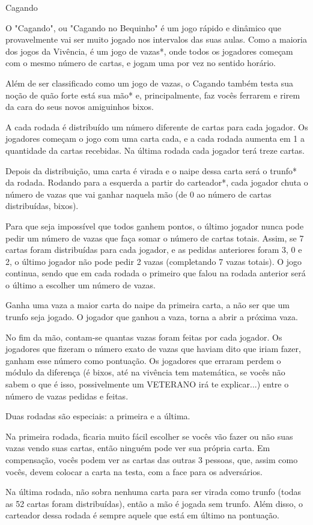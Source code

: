 \begin{subsecao}{Cagando}

O "Cagando", ou "Cagando no Bequinho" é um jogo rápido e dinâmico que
provavelmente vai ser muito jogado nos intervalos das suas aulas. Como a maioria
dos jogos da Vivência, é um jogo de vazas*, onde todos os jogadores começam com
o mesmo número de cartas, e jogam uma por vez no sentido horário.

Além de ser classificado como um jogo de vazas, o Cagando também testa sua noção
de quão forte está sua mão* e, principalmente, faz vocês ferrarem e rirem da
cara do seus novos amiguinhos bixos.

A cada rodada é distribuído um número diferente de cartas para cada jogador. Os
jogadores começam o jogo com uma carta cada, e a cada rodada aumenta em 1 a
quantidade da cartas recebidas. Na última rodada cada jogador terá treze cartas.

Depois da distribuição, uma carta é virada e o naipe dessa carta será o trunfo*
da rodada. Rodando para a esquerda a partir do carteador*, cada jogador chuta o
número de vazas que vai ganhar naquela mão (de 0 ao número de cartas
distribuídas, bixos).

Para que seja impossível que todos ganhem pontos, o último jogador nunca pode
pedir um número de vazas que faça somar o número de cartas totais. Assim, se 7
cartas foram distribuídas para cada jogador, e as pedidas anteriores foram 3, 0
e 2, o último jogador não pode pedir 2 vazas (completando 7 vazas totais). O
jogo continua, sendo que em cada rodada o primeiro que falou na rodada anterior
será o último a escolher um número de vazas. 

Ganha uma vaza a maior carta do naipe da primeira carta, a não ser que um
trunfo seja jogado. O jogador que ganhou a vaza, torna a abrir a próxima vaza. 

No fim da mão, contam-se quantas vazas foram feitas por cada
jogador. Os jogadores que fizeram o número exato de vazas que haviam
dito que iriam fazer, ganham esse número como pontuação. Os jogadores
que erraram perdem o módulo da diferença (é bixos, até na vivência tem
matemática, se vocês não sabem o que é isso, possivelmente um VETERANO
irá te explicar...) entre o número de vazas pedidas e feitas.

Duas rodadas são especiais: a primeira e a última. 

Na primeira rodada, ficaria muito fácil escolher se vocês vão fazer ou não suas
vazas vendo suas cartas, então ninguém pode ver sua própria carta. Em
compensação, vocês podem ver as cartas das outras 3 pessoas, que, assim como
vocês, devem colocar a carta na testa, com a face para os adversários.

Na última rodada, não sobra nenhuma carta para ser virada como trunfo (todas
as 52 cartas foram distribuídas), então a mão é jogada sem trunfo. Além disso,
o carteador dessa rodada é sempre aquele que está em último na pontuação.

\end{subsecao}
